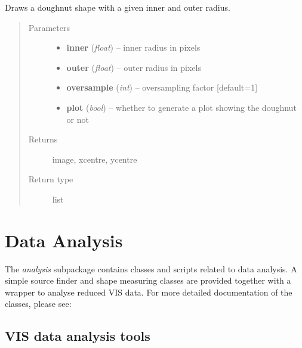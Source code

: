 \documentclass[a4paper,11pt,english]{sphinxmanual}
\begin{document}
\begin{fulllineitems}
\label{reduction:analysis.analyseGhosts.drawDoughnut}
Draws a doughnut shape with a given inner and outer radius.
\begin{quote}\begin{description}
\item[{Parameters}] \leavevmode\begin{itemize}
\item {} 
\textbf{inner} (\emph{float}) -- inner radius in pixels

\item {} 
\textbf{outer} (\emph{float}) -- outer radius in pixels

\item {} 
\textbf{oversample} (\emph{int}) -- oversampling factor {[}default=1{]}

\item {} 
\textbf{plot} (\emph{bool}) -- whether to generate a plot showing the doughnut or not

\end{itemize}

\item[{Returns}] \leavevmode
image, xcentre, ycentre

\item[{Return type}] \leavevmode
list

\end{description}\end{quote}

\end{fulllineitems}



\chapter{Data Analysis}
\label{index:data-analysis}
The \emph{analysis} subpackage contains classes and scripts related to data analysis. A simple source finder and shape
measuring classes are provided together with a wrapper to analyse reduced VIS data. For more detailed
documentation of the classes, please see:


\section{VIS data analysis tools}
\label{analysis::doc}\label{analysis:module-analysis.analyse}\label{analysis:vis-data-analysis-tools}
\end{document}
